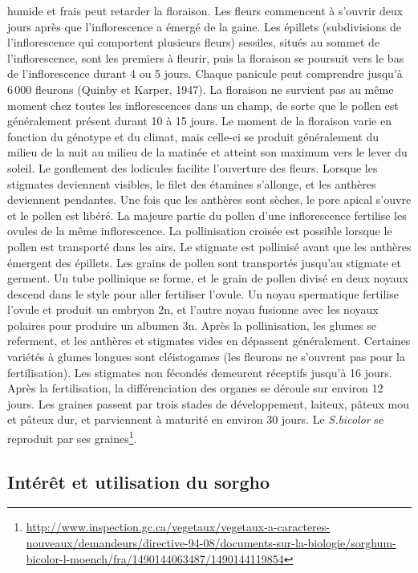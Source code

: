 \documentclass[a4paper,11pt]{article}
\begin{document}
humide et frais peut retarder la floraison. Les fleurs commencent à
s’ouvrir deux jours après que l’inflorescence a émergé de la
gaine. Les épillets (subdivisions de l’inflorescence qui comportent
plusieurs fleurs) sessiles, situés au sommet de l’inflorescence, sont
les premiers à fleurir, puis la floraison se poursuit vers le bas de
l’inflorescence durant 4 ou 5 jours. Chaque panicule peut comprendre
jusqu’à 6\,000 fleurons (Quinby et Karper, 1947). La floraison ne
survient pas au même moment chez toutes les inflorescences dans un
champ, de sorte que le pollen est généralement présent durant 10 à 15
jours. Le moment de la floraison varie en fonction du génotype et du
climat, mais celle-ci se produit généralement du milieu de la nuit au
milieu de la matinée et atteint son maximum vers le lever du
soleil. Le gonflement des lodicules facilite l’ouverture des
fleurs. Lorsque les stigmates deviennent visibles, le filet des
étamines s’allonge, et les anthères deviennent pendantes. Une fois que
les anthères sont sèches, le pore apical s’ouvre et le pollen est
libéré. La majeure partie du pollen d’une inflorescence fertilise les
ovules de la même inflorescence. La pollinisation croisée est possible
lorsque le pollen est transporté dans les airs. Le stigmate est
pollinisé avant que les anthères émergent des épillets. Les grains de
pollen sont transportés jusqu’au stigmate et germent. Un tube
pollinique se forme, et le grain de pollen divisé en deux noyaux
descend dans le style pour aller fertiliser l’ovule. Un noyau
spermatique fertilise l’ovule et produit un embryon 2n, et l’autre
noyau fusionne avec les noyaux polaires pour produire un albumen
3n. Après la pollinisation, les glumes se referment, et les anthères
et stigmates vides en dépassent généralement. Certaines variétés à
glumes longues sont cléistogames (les fleurons ne s’ouvrent pas pour
la fertilisation). Les stigmates non fécondés demeurent réceptifs
jusqu’à 16 jours. Après la fertilisation, la différenciation des
organes se déroule sur environ 12 jours. Les graines passent par trois
stades de développement, laiteux, pâteux mou et pâteux dur, et
parviennent à maturité en environ 30 jours. Le \emph{S.bicolor} se reproduit
par ses graines\footnote{\url{http://www.inspection.gc.ca/vegetaux/vegetaux-a-caracteres-nouveaux/demandeurs/directive-94-08/documents-sur-la-biologie/sorghum-bicolor-l-moench/fra/1490144063487/1490144119854}}.


\subsection{Intérêt et utilisation du sorgho}
\end{document}
